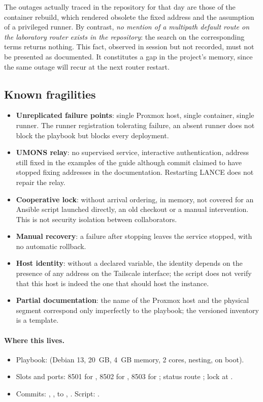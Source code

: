 The outages actually traced in the repository for that day are those of the
container rebuild, which rendered obsolete the fixed address and the assumption of
a privileged runner. By contrast, \emph{no mention of a multipath default route on
the laboratory router exists in the repository}: the search on the corresponding
terms returns nothing. This fact, observed in session but not recorded, must not be
presented as documented. It constitutes a gap in the project's memory, since the
same outage will recur at the next router restart.

\subsection{Known fragilities}

\begin{itemize}
\item \textbf{Unreplicated failure points}: single Proxmox host, single container,
single runner. The runner registration tolerating failure, an absent runner does
not block the playbook but blocks every deployment.
\item \textbf{UMONS relay}: no supervised service, interactive authentication,
address still fixed in the examples of the guide although commit
 claimed to have stopped fixing addresses in the documentation.
Restarting LANCE does not repair the relay.
\item \textbf{Cooperative lock}: without arrival ordering, in memory, not covered
for an Ansible script launched directly, an old checkout or a manual
intervention. This is not security isolation between collaborators.
\item \textbf{Manual recovery}: a failure after stopping leaves the service
stopped, with no automatic rollback.
\item \textbf{Host identity}: without a declared variable, the identity depends on
the presence of any address on the Tailscale interface; the script does not verify
that this host is indeed the one that should host the instance.
\item \textbf{Partial documentation}: the name of the Proxmox host and the
physical segment correspond only imperfectly to the playbook; the versioned
inventory is a template.
\end{itemize}

\paragraph{Where this lives.}
\begin{itemize}
\item Playbook:  (Debian 13, 20~GB, 4~GB memory, 2 cores, nesting, on boot).
\item Slots and ports: 8501 for , 8502 for , 8503 for ; status route ; lock at .
\item Commits: , ,  to , . Script: .
\end{itemize}
